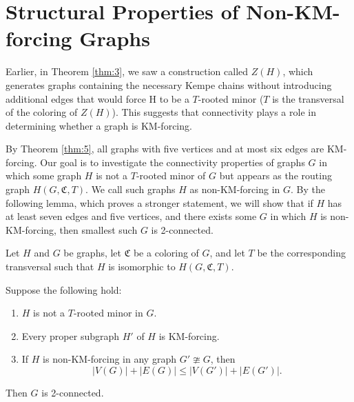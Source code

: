 \chapter{Structural Properties of Non-KM-forcing Graphs}

Earlier, in Theorem \ref{thm:3}, we saw a construction called \( Z(H) \), which generates graphs containing the necessary Kempe chains without introducing additional
edges that would force H to be a \( T \)-rooted minor ($T$ is the transversal of the coloring of $Z(H)$). This suggests that connectivity plays a role in determining whether a graph is KM-forcing.

By Theorem \ref{thm:5}, all graphs with five vertices and at most six edges are KM-forcing.
Our goal is to investigate the connectivity properties of graphs \( G \) in which some graph \( H \) is not a $T$-rooted minor of $G$ but appears as the routing graph \( H(G,\mathfrak{C}, T) \). We call such graphs $H$ as non-KM-forcing in $G$.
By the following lemma, which proves a stronger statement, we will show that if \( H \) has at least seven edges and five vertices, and there exists some \( G \) in which \( H \) is non-KM-forcing, then smallest such \( G \) is 2-connected.


\begin{lemma}
   \label{main-lemma}
 Let $H$ and $G$ be graphs, let $\mathfrak{C}$ be a coloring of $G$, and let $T$ be the corresponding transversal such that
   $H$ is isomorphic to $H(G, \mathfrak{C}, T)$.
   
 Suppose the following hold:
   \begin{enumerate}
      \item $H$ is not a $T$-rooted minor in $G$.
      \item Every proper subgraph $H'$ of $H$ is KM-forcing.
      \item If $H$ is non-KM-forcing in any graph $G' \ncong G$, then
     $$|V(G)| + |E(G)| \leq |V(G')| + |E(G')|.$$
   \end{enumerate}
 Then $G$ is 2-connected.
\end{lemma}
   
